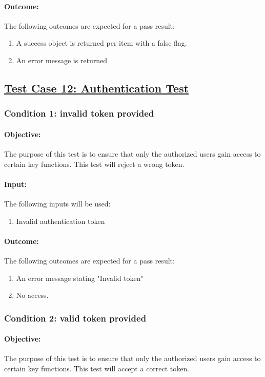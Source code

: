 \documentclass{article}
\begin{document}
\paragraph{Outcome:} The following outcomes are expected for a pass result:
\begin{enumerate}
	\item A success object is returned per item with a false flag.
	\item An error message is returned
\end{enumerate}

\pagebreak 

\subsection{\underline{Test Case 12: Authentication Test}}\label{test12}
\subsubsection{Condition 1: invalid token provided}
\paragraph{Objective:} The purpose of this test is to ensure that only the authorized users gain access to certain key functions. This test will reject a wrong token.
\paragraph{Input:} The following inputs will be used:
	\begin{enumerate}
  		\item Invalid authentication token
 	\end{enumerate}  

\paragraph{Outcome:} The following outcomes are expected for a pass result:
\begin{enumerate}
	\item An error message stating "Invalid token"
	\item No access.
\end{enumerate}

\subsubsection{Condition 2: valid token provided }
\paragraph{Objective:}  The purpose of this test is to ensure that only the authorized users gain access to certain key functions. This test will accept a correct token.
\end{document}
